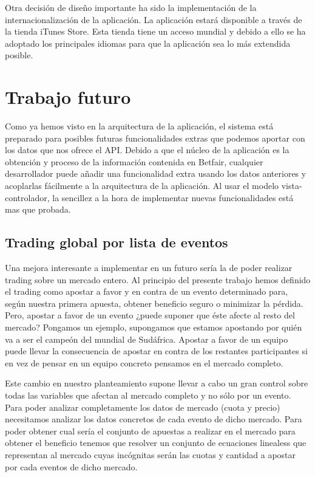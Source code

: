  Otra decisión de diseño importante ha sido la implementación de la internacionalización de la aplicación. La aplicación estará disponible a través de la tienda iTunes Store. Esta tienda tiene un acceso mundial y debido a ello se ha adoptado los principales idiomas para que la aplicación sea lo más extendida posible. 
 
\section{Trabajo futuro}
 Como ya hemos visto en la arquitectura de la aplicación, el sistema está preparado para posibles futuras funcionalidades extras que podemos aportar con los datos que nos ofrece el API. Debido a que el núcleo de la aplicación es la obtención y proceso de la información contenida en Betfair, cualquier desarrollador puede añadir una funcionalidad extra usando los datos anteriores y acoplarlas fácilmente a la arquitectura de la aplicación. Al usar el modelo vista-controlador, la sencillez a la hora de implementar nuevas funcionalidades está mas que probada.
 
\subsection{Trading global por lista de eventos}
 Una mejora interesante a implementar en un futuro sería la de poder realizar trading sobre un mercado entero. Al principio del presente trabajo hemos definido el trading como apostar a favor y en contra de un evento determinado para, según nuestra primera apuesta, obtener beneficio seguro o minimizar la pérdida. Pero, apostar a favor de un evento ¿puede suponer que éste afecte al resto del mercado? Pongamos un ejemplo, supongamos que estamos apostando por quién va a ser el campeón del mundial de Sudáfrica. Apostar a favor de un equipo puede llevar la consecuencia de apostar en contra de los restantes participantes si en vez de pensar en un equipo concreto pensamos en el mercado completo. 
 
  Este cambio en nuestro planteamiento supone llevar a cabo un gran control sobre todas las variables que afectan al mercado completo y no sólo por un evento. Para poder analizar completamente los datos de mercado (cuota y precio) necesitamos analizar los datos concretos de cada evento de dicho mercado. Para poder obtener cual sería el conjunto de apuestas a realizar en el mercado para obtener el beneficio tenemos que resolver un conjunto de ecuaciones linealess que representan al mercado cuyas incógnitas serán las cuotas y cantidad a apostar por cada eventos de dicho mercado.
   
